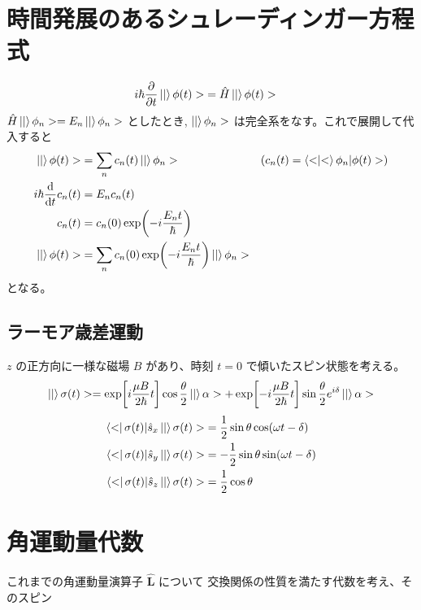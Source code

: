 \documentclass[uplatex,dvipdfmx,a4paper,11pt]{jlreq}
\numberwithin{equation}{section}
\theoremstyle{definition}
\begin{document}
\section{時間発展のあるシュレーディンガー方程式}
\begin{align}
  i\hbar\pdv{t}\ket|\phi(t)> & = \hat{H}\ket|\phi(t)>
\end{align}
$\hat{H}\ket|\phi_n> = E_n\ket|\phi_n>$ としたとき, $\ket|\phi_n>$ は完全系をなす。これで展開して代入すると
\begin{align}
  \ket|\phi(t)>      & = \sum_nc_n(t)\ket|\phi_n>                           & \qty(c_n(t) = \braket<\phi_n|\phi(t)>) \\
  i\hbar\dv{t}c_n(t) & = E_nc_n(t)                                                                                   \\
  c_n(t)             & = c_n(0)\exp(-i\frac{E_nt}{\hbar})                                                            \\
  \ket|\phi(t)>      & = \sum_nc_n(0)\exp(-i\frac{E_nt}{\hbar})\ket|\phi_n>
\end{align}
となる。


\subsection{ラーモア歳差運動}
$z$ の正方向に一様な磁場 $B$ があり、時刻 $t = 0$ で傾いたスピン状態を考える。
\begin{align}
  \ket|\sigma(t)> = \exp[i\frac{\mu B}{2\hbar}t]\cos\frac{\theta}{2}\ket|\alpha> + \exp[-i\frac{\mu B}{2\hbar}t]\sin\frac{\theta}{2}e^{i\delta}\ket|\alpha>
\end{align}
\begin{align}
  \bra<\sigma(t)|\hat{s}_x\ket|\sigma(t)> & = \frac{1}{2}\sin\theta\cos(\omega t - \delta)  \\
  \bra<\sigma(t)|\hat{s}_y\ket|\sigma(t)> & = -\frac{1}{2}\sin\theta\sin(\omega t - \delta) \\
  \bra<\sigma(t)|\hat{s}_z\ket|\sigma(t)> & = \frac{1}{2}\cos\theta
\end{align}



\section{角運動量代数}
これまでの角運動量演算子 $\hat{\bm{L}}$ について
交換関係の性質を満たす代数を考え、そのスピン
\end{document}
